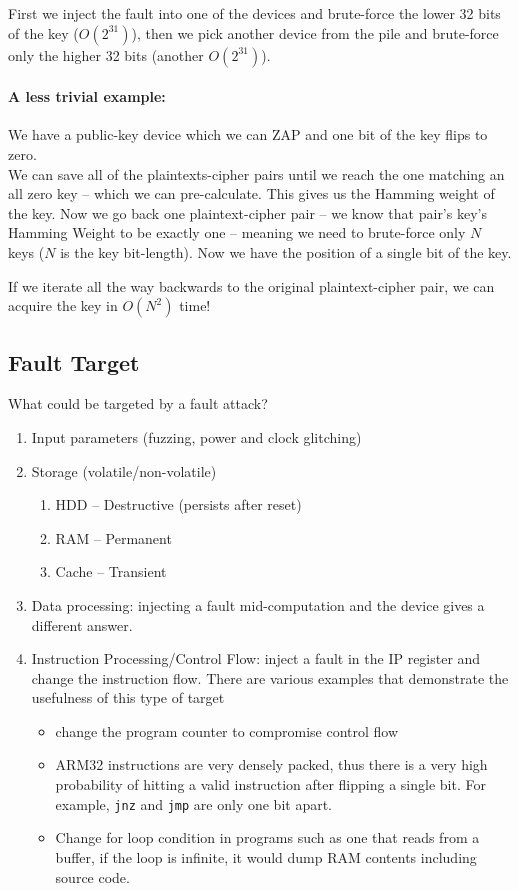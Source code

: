 First we inject the fault into one of the devices and brute-force the lower 32
bits of the key (\(O(2^{31})\)), then we pick another device from the pile and
brute-force only the higher 32 bits (another \(O(2^{31})\)).

\paragraph{A less trivial example:} We have a public-key device which we can ZAP
and one bit of the key flips to zero. \\
We can save all of the plaintexts-cipher pairs until we reach the one matching
an all zero key -- which we can pre-calculate. This gives us the Hamming weight
of the key. Now we go back one plaintext-cipher pair -- we know that pair's
key's Hamming Weight to be exactly one -- meaning we need to brute-force only
\(N\) keys (\(N\) is the key bit-length). Now we have the position of a single
bit of the key.

If we iterate all the way backwards to the original plaintext-cipher pair, we
can acquire the key in \(O(N^2)\) time!

\subsection{Fault Target}\label{subsec:fault_targets}
What could be targeted by a fault attack?
\begin{enumerate}
	\item Input parameters (fuzzing, power and clock glitching)
	\item Storage (volatile/non-volatile)
	\begin{enumerate}
		\item HDD -- Destructive (persists after reset)
		\item RAM -- Permanent
		\item Cache -- Transient
	\end{enumerate}
	\item Data processing: injecting a fault mid-computation and the device gives a
	different answer.
	\item Instruction Processing/Control Flow: inject a fault in the IP register
	and change the instruction flow. There are various examples that demonstrate
	the usefulness of this type of target
	\begin{itemize}
		\item change the program counter to compromise control flow
		\item ARM32 instructions are very densely packed, thus there is a very
		high probability of hitting a valid instruction after flipping a single
		bit. For example, \texttt{jnz} and \texttt{jmp} are only one bit apart.
		\item Change for loop condition in programs such as one that
		reads from a buffer, if the loop is infinite, it would dump RAM contents
		including source code.
	\end{itemize}
\end{enumerate}

